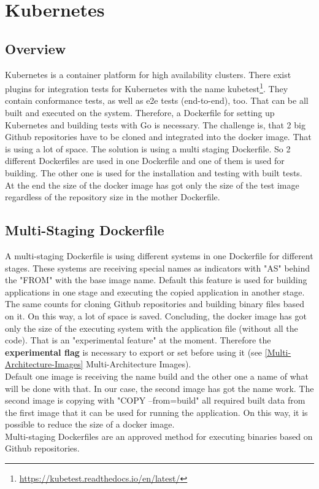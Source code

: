 \chapter{Kubernetes}\label{ch:kubernetes}

\section{Overview}

Kubernetes is a container platform for high availability clusters.
There exist plugins for integration tests for Kubernetes with the name kubetest\footnote{\url{https://kubetest.readthedocs.io/en/latest/}}. They contain conformance tests, as well as e2e tests (end-to-end), too.
That can be all built and executed on the system. Therefore, a Dockerfile for setting up Kubernetes and building tests with Go is necessary. The challenge is, that 2 big Github repositories have to be cloned and integrated into the docker image. That is using a lot of space. The solution is using a multi staging Dockerfile. 
So 2 different Dockerfiles are used in one Dockerfile and one of them is used for building. The other one is used for the installation and testing with built tests. At the end the size of the docker image has got only the size of the test image regardless of the repository size in the mother Dockerfile.


\section{Multi-Staging Dockerfile}

A multi-staging Dockerfile is using different systems in one Dockerfile for different stages. These systems are receiving special names as indicators with "AS" behind the "FROM" with the base image name. 
Default this feature is used for building applications in one stage and executing the copied application in another stage. The same counts for cloning Github repositories and building binary files based on it. On this way, a lot of space is saved.
Concluding, the docker image has got only the size of the executing system with the application file (without all the code). 
That is an "experimental feature"  at the moment. Therefore the \textbf{experimental flag} is necessary to export or set before using it (see \ref{Multi-Architecture-Images} Multi-Architecture Images). \\
Default one image is receiving the name build and the other one a name of what will be done with that. In our case, the second image has got the name work. 
The second image is copying with "COPY --from=build" all required built data from the first image that it can be used for running the application. 
On this way, it is possible to reduce the size of a docker image. \\
Multi-staging Dockerfiles are an approved method for executing binaries based on Github repositories.

